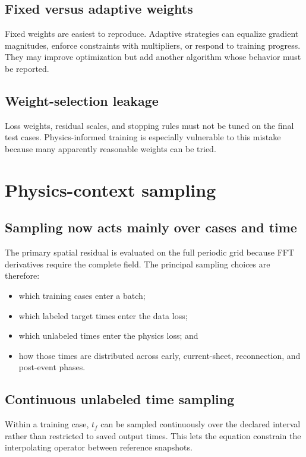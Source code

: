 \documentclass[11pt]{article}
\begin{document}
\subsection{Fixed versus adaptive weights}
Fixed weights are easiest to reproduce. Adaptive strategies can equalize gradient magnitudes, enforce constraints with multipliers, or respond to training progress. They may improve optimization but add another algorithm whose behavior must be reported.

\subsection{Weight-selection leakage}
Loss weights, residual scales, and stopping rules must not be tuned on the final test cases. Physics-informed training is especially vulnerable to this mistake because many apparently reasonable weights can be tried.

\section{Physics-context sampling}
\label{sec:sampling}

\subsection{Sampling now acts mainly over cases and time}
The primary spatial residual is evaluated on the full periodic grid because FFT derivatives require the complete field. The principal sampling choices are therefore:
\begin{itemize}
  \item which training cases enter a batch;
  \item which labeled target times enter the data loss;
  \item which unlabeled times enter the physics loss; and
  \item how those times are distributed across early, current-sheet, reconnection, and post-event phases.
\end{itemize}

\subsection{Continuous unlabeled time sampling}
Within a training case, $t_f$ can be sampled continuously over the declared interval rather than restricted to saved output times. This lets the equation constrain the interpolating operator between reference snapshots.
\end{document}
